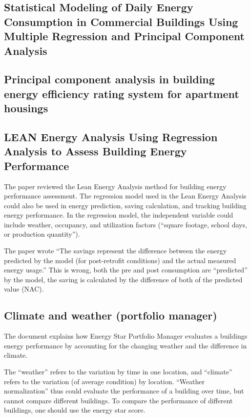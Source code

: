 \documentclass[12pt]{article}
\begin{document}
\subsection{Statistical Modeling of Daily Energy Consumption in
  Commercial Buildings Using Multiple Regression and Principal
  Component Analysis~\cite{claridge1992statistical}}
\subsection{Principal component analysis in building energy efficiency
  rating system for apartment housings~\cite{jung2014principal}}
\subsection{LEAN Energy Analysis Using Regression Analysis to Assess
  Building Energy Performance~\cite{leanEng}}
The paper reviewed the Lean Energy Analysis method for building energy
performance assessment. The regression model used in the Lean Energy
Analysis could also be used in energy prediction, saving calculation,
and tracking building energy performance. In the regression model, the
independent variable could include weather, occupancy, and utilization
factors (``square footage, school days, or production quantity''). 

The paper wrote ``The savings represent the difference between the
energy predicted by the model (for post-retrofit conditions) and the
actual measured energy usage.'' This is wrong, both the pre and post
consumption are ``predicted'' by the model, the saving is calculated
by the difference of both of the predicted value (NAC).
\subsection{Climate and weather (portfolio manager)~\cite{pmWeather}}
The document explains how Energy Star Portfolio Manager evaluates a
buildings energy performance by accounting for the changing weather
and the difference in climate.

The ``weather'' refers to the variation by time in one location, and
``climate'' refers to the variation (of average condition) by
location. ``Weather normalization'' thus could evaluate the
performance of a building over time, but cannot compare different
buildings. To compare the performance of different buildings, one
should use the energy star score.
\end{document}
